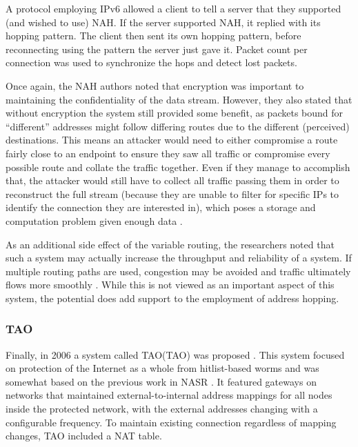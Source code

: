 \par A protocol employing \ac{IPv6} allowed a client to tell a server that they supported (and wished to use) NAH. If the server supported NAH, it replied with its hopping pattern. The client then sent its own hopping pattern, before reconnecting using the pattern the server just gave it. Packet count per connection was used to synchronize the hops and detect lost packets.

\par Once again, the NAH authors noted that encryption was important to maintaining the confidentiality of the data stream. However, they also stated that without encryption the system still provided some benefit, as packets bound for ``different'' addresses might follow differing routes due to the different (perceived) destinations. This means an attacker would need to either compromise a route fairly close to an endpoint to ensure they saw all traffic or compromise every possible route and collate the traffic together. Even if they manage to accomplish that, the attacker would still have to collect all traffic passing them in order to reconstruct the full stream (because they are unable to filter for specific IPs to identify the connection they are interested in), which poses a storage and computation problem given enough data \cite{NAH}.

\par As an additional side effect of the variable routing, the researchers noted that such a system may actually increase the throughput and reliability of a system. If multiple routing paths are used, congestion may be avoided and traffic ultimately flows more smoothly \cite{MultimediaDistributed}. While this is not viewed as an important aspect of this system, the potential does add support to the employment of address hopping.

\subsubsection{\acf{TAO}}
\par Finally, in 2006 a system called \ac{TAO}(TAO) was proposed \cite{TAO}. This system focused on protection of the Internet as a whole from hitlist-based worms and was somewhat based on the previous work in \ac{NASR} \cite{NASR}. It featured gateways on networks that maintained external-to-internal address mappings for all nodes inside the protected network, with the external addresses changing with a configurable frequency. To maintain existing connection regardless of mapping changes, TAO included a \ac{NAT} table. 

